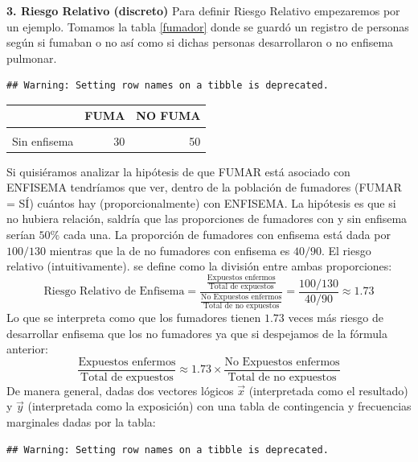 \documentclass[
]{book}
\begin{document}
\textbf{3. Riesgo Relativo (discreto)}
Para definir Riesgo Relativo empezaremos por un ejemplo. Tomamos la tabla \eqref{fumador} donde se guardó un registro de personas según si fumaban o no así como si dichas personas desarrollaron o no enfisema pulmonar.

\begin{verbatim}
## Warning: Setting row names on a tibble is deprecated.
\end{verbatim}

\begin{table}
\centering
\begin{tabular}{l|r|r}
\hline
  & FUMA & NO FUMA\\
\hline
\cellcolor{gray!6}{Con enfisema} & \cellcolor{gray!6}{100} & \cellcolor{gray!6}{40}\\
\hline
Sin enfisema & 30 & 50\\
\hline
\end{tabular}
\end{table}

Si quisiéramos analizar la hipótesis de que FUMAR está asociado con ENFISEMA tendríamos que ver, dentro de la población de fumadores (FUMAR = SÍ) cuántos hay (proporcionalmente) con ENFISEMA. La hipótesis es que si no hubiera relación, saldría que las proporciones de fumadores con y sin enfisema serían \(50\%\) cada una. La proporción de fumadores con enfisema está dada por \(100/130\) mientras que la de no fumadores con enfisema es \(40/90\). El riesgo relativo (intuitivamente). se define como la división entre ambas proporciones:
\[
\text{Riesgo Relativo de Enfisema} = \dfrac{\frac{\text{Expuestos enfermos}}{\text{Total de expuestos}}}{\frac{\text{No Expuestos enfermos}}{\text{Total de no expuestos}}} =  \dfrac{100/130}{40/90} \approx 1.73
\]
Lo que se interpreta como que los fumadores tienen \(1.73\) veces más riesgo de desarrollar enfisema que los no fumadores ya que si despejamos de la fórmula anterior:
\[
\frac{\text{Expuestos enfermos}}{\text{Total de expuestos}}   \approx 1.73 \times \frac{\text{No Expuestos enfermos}}{\text{Total de no expuestos}}
\]
De manera general, dadas dos vectores lógicos \(\vec{x}\) (interpretada como el resultado) y \(\vec{y}\) (interpretada como la exposición) con una tabla de contingencia y frecuencias marginales dadas por la tabla:

\begin{verbatim}
## Warning: Setting row names on a tibble is deprecated.
\end{verbatim}
\end{document}
